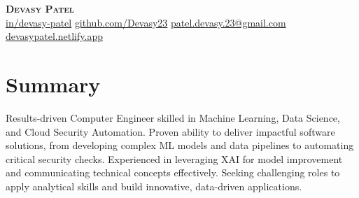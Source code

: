 \documentclass[letterpaper,11pt]{article}
\begin{document}

\begin{center}
    \textbf{\Huge \scshape Devasy Patel} \\ \vspace{6pt} %
     \faLinkedin \hspace{1pt} %
    \href{https://linkedin.com/in/devasy-patel}{in/devasy-patel} \quad %
     \faGithub \hspace{1pt}
    \href{https://github.com/Devasy23}{github.com/Devasy23} \quad
     \faEnvelope \hspace{1pt}
    \href{mailto:patel.devasy.23@gmail.com}{patel.devasy.23@gmail.com} \quad
   \faGlobe \hspace{1pt} %
  \href{https://devasypatel.netlify.app}{devasypatel.netlify.app} \quad %

\end{center}
\vspace{-10pt} %

\section{Summary}
Results-driven Computer Engineer skilled in Machine Learning, Data Science, and Cloud Security Automation. Proven ability to deliver impactful software solutions, from developing complex ML models and data pipelines to automating critical security checks. Experienced in leveraging XAI for model improvement and communicating technical concepts effectively. Seeking challenging roles to apply analytical skills and build innovative, data-driven applications.
\end{document}
